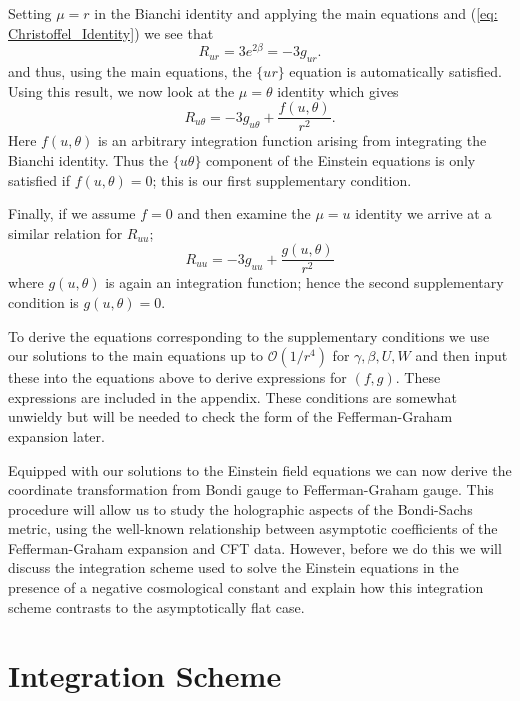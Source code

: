 \documentclass[a4paper,11pt]{article}
\numberwithin{equation}{section}
\begin{document}
Setting $\mu=r$ in the Bianchi identity and applying the main equations and (\ref{eq: Christoffel_Identity}) we see that 
\begin{equation}
R_{u r}=3 e^{2\beta}=-3 g_{u r}.
\end{equation}
and thus, using the main equations, the $\{u r \}$ equation is automatically satisfied. Using this result, we now look at the $\mu=\theta$ identity which gives
\begin{equation}
R_{u \theta}=-3 g_{u \theta}+\frac{f(u,\theta)}{r^2}.
\end{equation}
Here $f(u, \theta)$ is an arbitrary integration function arising from integrating the Bianchi identity. Thus the $\{u \theta \}$ component of the Einstein equations is only satisfied if $f(u, \theta)=0$; this is our first supplementary condition.

Finally, if we assume $f=0$ and then examine the $\mu=u$ identity we arrive at a similar relation for $R_{u u}$;
\begin{equation}
R_{uu}=-3 g_{uu}+\frac{g(u,\theta)}{r^2}
\end{equation}
where $g(u, \theta)$ is again an integration function; hence the second supplementary condition is $g(u, \theta)=0$. 

To derive the equations corresponding to the supplementary conditions we use our solutions to the main equations up to $\mathcal{O}(1/r^4)$ for $\gamma, \beta, U, W$ and then input these into the equations above to derive expressions for $(f, g)$. These expressions are included in the appendix. These conditions are somewhat unwieldy but will be needed to check the form of the Fefferman-Graham expansion later. 

Equipped with our solutions to the Einstein field equations we can now derive the coordinate transformation from Bondi gauge to Fefferman-Graham gauge. This procedure will allow us to study the holographic aspects of the Bondi-Sachs metric, using the well-known relationship between asymptotic coefficients of the Fefferman-Graham expansion and CFT data. However, before we do this we will discuss the integration scheme used to solve the Einstein equations in the presence of a negative cosmological constant and explain how this integration scheme contrasts to the asymptotically flat case.

\section{Integration Scheme} \label{sec: Integration Scheme - Minkowski Vs. $AdS$}
\end{document}
